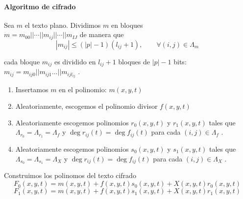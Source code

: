 \documentclass[12pt]{article}
\begin{document}



\paragraph*{Algoritmo de cifrado}


Sea $m$ el texto plano. Dividimos $m$ en bloques \\$m = m_{00} || \cdots||m_{ij} || \cdots||m_{IJ}$ de manera que
 $$|m_{ij}|\leq (|p| - 1)(l_{ij} + 1), \qquad\forall (i, j) \in\Lambda_m$$ 
 
cada bloque $m_{ij}$ es dividido en  $l_{ij} + 1$ bloques de  $|p| - 1$ bits: $m_{ij} = m_{ij0} ||m_{ij1} \ldots ||m_{ijl_{ij}}$ .
 
\begin{enumerate}
\item Insertamos $m$ en el polinomio: $m(x, y, t)$

\item Aleatoriamente, escogemos el polinomio divisor $f (x, y, t)$

\item Aleatoriamente escogemos polinomios $r_0 (x, y, t)$ y $r_1 (x, y, t)$ tales que  $\Lambda_{r_0} = \Lambda_{r_1} = \Lambda_f$ y
 $\deg r_{ij} (t) = \deg f_{ij} (t)$ para cada $(i, j) \in\Lambda_f$ .

\item Aleatoriamente escogemos polinomios $s_0 (x, y, t)$ y $s_1 (x, y, t)$ tales que  $\Lambda_{s_0} = \Lambda_{s_1} = \Lambda_X$ y
 $\deg r_{ij} (t) = \deg f_{ij} (t)$ para cada $(i, j) \in\Lambda_X$ .
\end{enumerate}



Construimos los polinomos del texto cifrado
$$F_0 (x, y, t) = m(x, y, t) + f (x, y, t)s_0 (x, y, t) + X(x, y, t)r_0 (x, y, t)$$
$$F_1 (x, y, t) = m(x, y, t) + f (x, y, t)s_1 (x, y, t) + X(x, y, t)r_1 (x, y, t)$$




\end{document}
